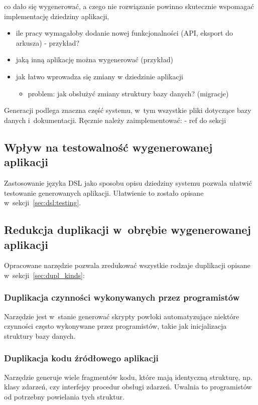 co dało się wygenerować, a czego nie
rozwiązanie powinno skutecznie wspomagać implementację dziedziny aplikacji,

\begin{itemize}
 \item ile pracy wymagałoby dodanie nowej funkcjonalności (API, eksport do arkusza) - przykład?
 \item jaką inną aplikację można wygenerować (przykład)
 \item jak łatwo wprowadza się zmiany w dziedzinie aplikacji
  \begin{itemize}
   \item problem: jak obsłużyć zmiany struktury bazy danych? (migracje)
  \end{itemize}
\end{itemize}

Generacji podlega znaczna część systemu, w~tym wszystkie pliki dotyczące bazy danych i~dokumentacji.
Ręcznie należy zaimplementować: - ref do sekcji


\subsection{Wpływ na testowalność wygenerowanej aplikacji}

Zastosowanie języka DSL jako sposobu opisu dziedziny systemu pozwala ułatwić testowanie generowanych aplikacji.
Ułatwienie to zostało opisane w~sekcji~\ref{sec:dsl:testing}.


\subsection{Redukcja duplikacji w~obrębie wygenerowanej aplikacji}

Opracowane narzędzie pozwala zredukować wszystkie rodzaje duplikacji opisane w~sekcji~\ref{sec:dupl_kinds}:

\subsubsection{Duplikacja czynności wykonywanych przez programistów}
Narzędzie jest w~stanie generować skrypty powłoki automatyzujące niektóre czynności często wykonywane przez programistów, takie jak inicjalizacja struktury bazy danych.

\subsubsection{Duplikacja kodu źródłowego aplikacji}
Narzędzie generuje wiele fragmentów kodu, które mają identyczną strukturę, np. klasy zdarzeń, czy interfejsy procedur obsługi zdarzeń.
Uwalnia to programistów od potrzebny powielania tych struktur.

